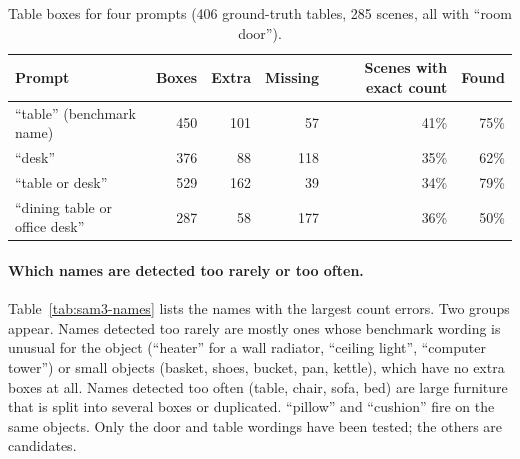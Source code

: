 \begin{table}[t]
\centering
\caption{Table boxes for four prompts (406 ground-truth tables, 285 scenes, all with ``room door'').}
\label{tab:sam3-table}
\begin{tabular}{lrrrrr}
\toprule
Prompt & Boxes & Extra & Missing & Scenes with exact count & Found \\
\midrule
``table'' (benchmark name)      & 450 & 101 &  57 & 41\% & 75\% \\
``desk''                        & 376 &  88 & 118 & 35\% & 62\% \\
``table or desk''               & 529 & 162 &  39 & 34\% & 79\% \\
``dining table or office desk'' & 287 &  58 & 177 & 36\% & 50\% \\
\bottomrule
\end{tabular}
\end{table}

\paragraph{Which names are detected too rarely or too often.}
Table~\ref{tab:sam3-names} lists the names with the largest count errors. Two groups appear.
Names detected too rarely are mostly ones whose benchmark wording is unusual for the object
(``heater'' for a wall radiator, ``ceiling light'', ``computer tower'') or small objects (basket, shoes, bucket,
pan, kettle), which have no extra boxes at all. Names detected too often (table, chair, sofa, bed) are large
furniture that is split into several boxes or duplicated. ``pillow'' and ``cushion'' fire on the same objects.
Only the door and table wordings have been tested; the others are candidates.

